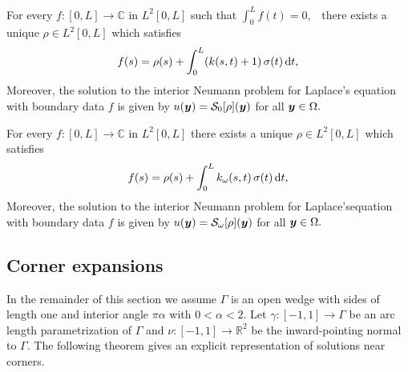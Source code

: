 \begin{theorem}
For every  $f:[0,L] \rightarrow \mathbb{C}$ in $L^{2}[0,L]$ such that $\int_{0}^{L} f(t) = 0,$ \, there exists a unique $\rho \in L^{2}[0,L]$ which satisfies
\begin{align}
f(s)=  \rho(s)+ \int_0^L (k(s,t) + 1)\,\sigma(t)\,{\rm d}t,
\label{bie_intn}
\end{align}
Moreover, the solution to the interior Neumann problem for Laplace's equation with boundary data $f$ is given by $u(\boldsymbol{y}) = \mathcal{S}_{0}[\rho](\boldsymbol{y})$ for all $\boldsymbol{y} \in \Omega.$
\end{theorem}


\begin{theorem}
For every $f:[0,L] \rightarrow \mathbb{C}$ in $L^{2}[0,L]$ there exists a unique $\rho \in L^{2}[0,L]$ which satisfies
\begin{align}
f(s)=  \rho(s)+ \int_0^L k_{\omega}(s,t) \,\sigma(t)\,{\rm d}t,
\label{bie_extn}
\end{align}
Moreover, the solution to the interior Neumann problem for Laplace'sequation with boundary data $f$ is given by $u(\boldsymbol{y}) = \mathcal{S}_{\omega}[\rho](\boldsymbol{y})$ for all $\boldsymbol{y} \in \Omega.$
\end{theorem}

\subsection{Corner expansions}

In the remainder of this section we assume $\Gamma$ is an open wedge with sides of length one and interior angle $\pi \alpha$ with $0 <\alpha<2.$ Let $\gamma:[-1,1] \rightarrow \Gamma$ be an arc length parametrization of $\Gamma$ and $\nu:[-1,1] \rightarrow \mathbb{R}^2$ be the inward-pointing normal to $\Gamma.$ 
The following theorem  gives an explicit representation of solutions near corners.

